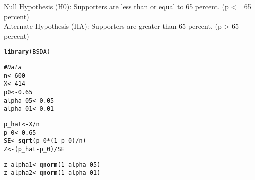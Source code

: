 \documentclass{article}\usepackage[]{graphicx}\usepackage[]{xcolor}
\makeatletter
\newcommand{\hlnum}[1]{\textcolor[rgb]{0.686,0.059,0.569}{#1}}%
\newcommand{\hlcom}[1]{\textcolor[rgb]{0.678,0.584,0.686}{\textit{#1}}}%
\newcommand{\hlopt}[1]{\textcolor[rgb]{0,0,0}{#1}}%
\newcommand{\hldef}[1]{\textcolor[rgb]{0.345,0.345,0.345}{#1}}%
\newcommand{\hlkwb}[1]{\textcolor[rgb]{0.69,0.353,0.396}{#1}}%
\newcommand{\hlkwd}[1]{\textcolor[rgb]{0.737,0.353,0.396}{\textbf{#1}}}%
\newenvironment{kframe}{%
 \def\at@end@of@kframe{}%
 \ifinner\ifhmode%
  \def\at@end@of@kframe{\end{minipage}}%
  \begin{minipage}{\columnwidth}%
 \fi\fi%
 \def\FrameCommand##1{\hskip\@totalleftmargin \hskip-\fboxsep
 \colorbox{shadecolor}{##1}\hskip-\fboxsep
     \hskip-\linewidth \hskip-\@totalleftmargin \hskip\columnwidth}%
 \MakeFramed {\advance\hsize-\width
   \@totalleftmargin\z@ \linewidth\hsize
   \@setminipage}}%
 {\par\unskip\endMakeFramed%
 \at@end@of@kframe}
\newenvironment{knitrout}{}{} %
\makeatother
\begin{document}
Null Hypothesis (H0): Supporters are less than or equal to 65 percent. (p <= 65 percent)\\
Alternate Hypothesis (HA): Supporters are greater than 65 percent. (p > 65 percent)

\begin{knitrout}
\color{fgcolor}\begin{kframe}
\begin{alltt}
\hlkwd{library}\hldef{(BSDA)}

\hlcom{# Data}
\hldef{n} \hlkwb{<-} \hlnum{600}
\hldef{X} \hlkwb{<-} \hlnum{414}
\hldef{p0} \hlkwb{<-} \hlnum{0.65}
\hldef{alpha_05} \hlkwb{<-} \hlnum{0.05}
\hldef{alpha_01} \hlkwb{<-} \hlnum{0.01}

\hldef{p_hat} \hlkwb{<-} \hldef{X} \hlopt{/} \hldef{n}
\hldef{p_0} \hlkwb{<-} \hlnum{0.65}
\hldef{SE} \hlkwb{<-} \hlkwd{sqrt}\hldef{(p_0} \hlopt{*} \hldef{(}\hlnum{1} \hlopt{-} \hldef{p_0)} \hlopt{/} \hldef{n)}
\hldef{Z} \hlkwb{<-} \hldef{(p_hat} \hlopt{-} \hldef{p_0)} \hlopt{/} \hldef{SE}

\hldef{z_alpha1} \hlkwb{<-} \hlkwd{qnorm}\hldef{(}\hlnum{1} \hlopt{-} \hldef{alpha_05)}
\hldef{z_alpha2} \hlkwb{<-} \hlkwd{qnorm}\hldef{(}\hlnum{1} \hlopt{-} \hldef{alpha_01)}


\end{alltt}
\end{kframe}
\end{knitrout}
\end{document}
